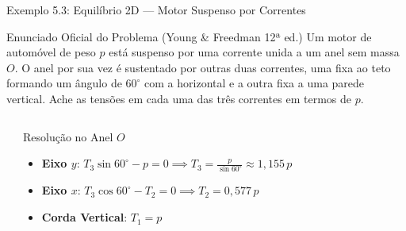 \documentclass[10pt,aspectratio=169]{beamer}
\begin{document}
\begin{frame}{Exemplo 5.3: Equilíbrio 2D --- Motor Suspenso por Correntes}
    \begin{block}{Enunciado Oficial do Problema (Young \& Freedman 12ª ed.)}
        \small
        Um motor de automóvel de peso $p$ está suspenso por uma corrente unida a um anel sem massa $O$. O anel por sua vez é sustentado por outras duas correntes, uma fixa ao teto formando um ângulo de $60^\circ$ com a horizontal e a outra fixa a uma parede vertical. Ache as tensões em cada uma das três correntes em termos de $p$.
    \end{block}
    \begin{columns}[T]
        \begin{center}
        \end{center}
        \begin{exampleblock}{Resolução no Anel $O$}
            \small
            \begin{itemize}\setlength{\itemsep}{3pt}
                \item \textbf{Eixo $y$}: $T_3 \sin 60^\circ - p = 0 \implies T_3 = \frac{p}{\sin 60^\circ} \approx 1{,}155 \, p$
                \item \textbf{Eixo $x$}: $T_3 \cos 60^\circ - T_2 = 0 \implies T_2 = 0{,}577 \, p$
                \item \textbf{Corda Vertical}: $T_1 = p$
            \end{itemize}
        \end{exampleblock}
    \end{columns}
\end{frame}
\end{document}
